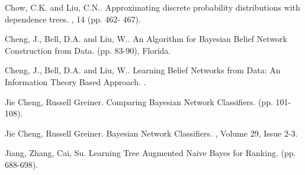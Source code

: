 \documentclass[twoside,twocolumn]{article}
\begin{document}
\begin{thebibliography}{99} %

Chow, C.K. and Liu, C.N..
\newblock Approximating discrete probability distributions with dependence trees.
, 14 (pp. 462- 467).

\bibitem[Cheng et al., 1997a]{}
Cheng, J., Bell, D.A. and Liu, W..
\newblock An Algorithm for Bayesian Belief Network Construction from Data.
 (pp. 83-90), Florida.

\bibitem[Cheng et al., 1997b]{}
Cheng, J., Bell, D.A. and Liu, W..
\newblock Learning Belief Networks from Data: An Information Theory Based Approach.
.

\bibitem[Cheng et al., 1999]{}
Jie Cheng, Russell Greiner.
\newblock Comparing Bayesian Network Classifiers.
 (pp. 101-108).

\bibitem[Friedman et al., 1997]{}
Jie Cheng, Russell Greiner.
\newblock Bayesian Network Classifiers.
, Volume 29, Issue 2-3.

\bibitem[Jiang et al., 2005]{}
Jiang, Zhang, Cai, Su.
\newblock Learning Tree Augmented Naive Bayes for Ranking.
 (pp. 688-698). 

\end{thebibliography}

\end{document}
